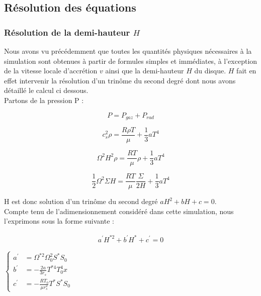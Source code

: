 \subsection{Résolution des équations}

\subsubsection{Résolution de la demi-hauteur $H$ \label{sec::res_H}}
Nous avons vu précédemment que toutes les quantités physiques nécessaires à la simulation sont obtenues à partir de formules simples et immédiates, à l'exception de la vitesse locale d'accrétion $v$ ainsi que la demi-hauteur $H$ du disque.  $H$ fait en effet intervenir la résolution d'un trinôme du second degré dont nous avons détaillé le calcul ci dessous. \\

Partons de la pression P : 

\begin{equation}
	P = P_{gaz} + P_{rad}
\end{equation}


\begin{equation}
	c_{s}^{2} \rho = \frac{R \rho T}{\mu} + \frac{1}{3} a T^{4}
\end{equation}


\begin{equation}
	\Omega^{2} H^{2} \rho = \frac{R T}{\mu} \rho + \frac{1}{3} a T^{4}
\end{equation}


\begin{equation}
	\frac{1}{2} \Omega^{2} \Sigma H = \frac{R T}{\mu} \frac{\Sigma}{2 H} + \frac{1}{3} a T^{4}
	\label{eq:trinôme}
\end{equation}  	   

H est donc solution d'un trinôme du second degré $ a H^{2} + b H + c = 0$. \\
Compte tenu de l'adimensionnement considéré dans cette simulation, nous l'exprimons sous la forme suivante :  

\begin{eqnarray}
  a^{\prime} H^{* 2}+b^{\prime}H^{*}+c^{\prime}=0
  \end{eqnarray}

$\begin{cases}  
      a^{\prime} &= \Omega^{*2} \Omega_{0}^{2} S^{*} S_{0}\\
      b^{\prime} &= - \frac{2 a}{3 r_{s}} T^{*4} T_{0}^{4} x \\
      c^{\prime}&=-\frac{RT_{0}}{\mu r_{s}^{2}} T^{*} S^{*} S_{0}
     \end{cases}$ \\


